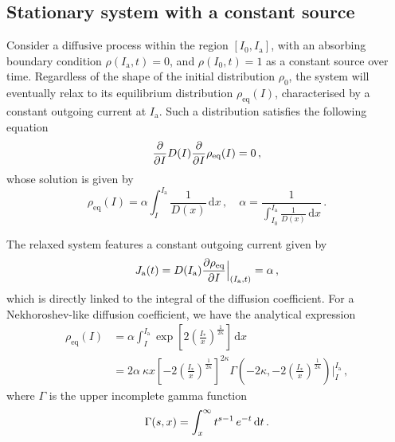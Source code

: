 {%

\subsection{Stationary system with a constant  source}\label{subsec:system_infinite_regime}


Consider a diffusive process within the region $[I_0, I_\mathrm{a}]$, with an absorbing boundary condition $\rho(I_\mathrm{a}, t) = 0$, and $\rho(I_0, t) = 1$ as a constant source over time. Regardless of the shape of the initial distribution $\rho_0$, the system will eventually relax to its equilibrium distribution $\rho_\text{eq}(I)$, characterised by a constant outgoing current at $I_\mathrm{a}$. Such a distribution satisfies the following equation
\begin{equation}
    \pdv{I} D(I) \pdv{I} \rho_{\text{eq}}(I) = 0 \,,
\end{equation}
whose solution is given by
\begin{equation}
    \rho_\text{eq}(I) = \alpha \int_I^{I_\mathrm{a}} \frac{1}{D(x)}\,\mathrm{d}x \,, \quad \alpha = \frac{1}{ \displaystyle{\int_{I_0}^{I_\mathrm{a}} \frac{1}{D(x)}\,\mathrm{d}x}} \, .
    \label{eq:equilibrium_stationary_distribution}
\end{equation}

The relaxed system features a constant outgoing current given by
\begin{equation}
    J_\mathrm{a}(t) = D(I_\mathrm{a})\pdv{\rho_\text{eq}}{I}\Bigr|_{(I_\mathrm{a},t)} = \alpha\,,
    \label{eq:equilibrium_stationary_current}
\end{equation} 
which is directly linked to the integral of the diffusion coefficient. For a Nekhoroshev-like diffusion coefficient, we have the analytical expression
\begin{equation}
    \begin{aligned}
        \rho_\text{eq}(I) &= \alpha \int_I^{I_\mathrm{a}} \exp\left[2\left(\frac{I_\ast}{x}\right)^{\frac{1}{2\kappa}}\right] \,\mathrm{d}x \\
        &= 2\alpha\ \kappa x \left[-2\left(\frac{I_\ast}{x}\right)^{\frac{1}{2\kappa}}\right]^{2\kappa} \Gamma\left(-2\kappa, -2\left(\frac{I_\ast}{x}\right)^{\frac{1}{2\kappa}}\right)\Bigg|_I^{I_\mathrm{a}}\,,
    \end{aligned}
\end{equation}
where $\Gamma$ is the upper incomplete gamma function
\begin{equation}
    \Gamma(s,x) = \int_x^{\infty} t^{s-1}\,e^{-t}\,{\rm d}t \,.
\end{equation}

}
